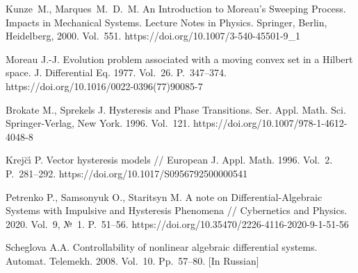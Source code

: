\documentclass[12pt]{llncs}
\begin{document}
\begin{thebibliography}{9} %

 Kunze~M., Marques~M.~D.~M. An Introduction to Moreau's Sweeping Process. Impacts in Mechanical Systems. Lecture Notes in Physics. Springer, Berlin, Heidelberg, 2000. Vol.~551. https://doi.org/10.1007/3-540-45501-9\_1

 Moreau J.-J. Evolution problem associated with a moving convex set in a Hilbert space. J. Differential Eq. 1977. Vol.~26. P.~347--374. https://doi.org/10.1016/0022-0396(77)90085-7

 Brokate M., Sprekels J. Hysteresis and Phase Transitions. Ser. Appl. Math. Sci. Springer-Verlag, New York. 1996. Vol.~121. https://doi.org/10.1007/978-1-4612-4048-8

 Krej\u{c}\'{\i} P. Vector hysteresis models // European J. Appl. Math. 1996. Vol.~2. P.~281--292. https://doi.org/10.1017/S0956792500000541

 Petrenko P., Samsonyuk O., Staritsyn M. A note on Differential-Algebraic Systems with Impulsive and Hysteresis Phenomena // Cybernetics  and Physics. 2020. Vol.~9, №~1. P.~51--56. https://doi.org/10.35470/2226-4116-2020-9-1-51-56

 Scheglova A.A. Controllability of nonlinear algebraic differential systems. Automat. Telemekh. 2008. Vol.~10. Pp.~57--80. [In Russian]



\end{thebibliography}
\end{document}
